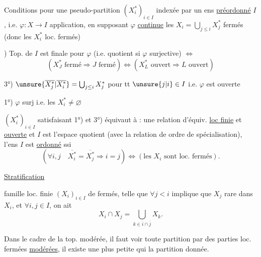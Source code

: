 Conditions pour une pseudo-partition $(X_i^*)_{i\in I}$  indexée par un ens
\uline{préordonné} $I$, i.e. $\varphi:X\longrightarrow I$ application, en supposant $\varphi$ \uline{continue}
 les $X_i=\bigcup_{j\leq i}X_j^*$ fermés (donc les $X_i^*$ loc. fermés)

) Top. de $I$ est finale pour $\varphi$ (i.e. quotient si $\varphi$ surjective) $\Longleftrightarrow$
\[
(X_J^*\text{ fermé}\Rightarrow J\text{ fermé})\Longleftrightarrow
(X_L^*\text{ ouvert}\Rightarrow L\text{ ouvert})
\]

3°) $\unsure{\overline{X_j^*}|\overline{X_i^*}}=\bigcup_{j\leq i}X_j^*$ pour tt $\unsure{j|i}\in I$ i.e. $\varphi$ est ouverte

1°) $\varphi$ surj i.e. les $X_i^*\ne\varnothing$


 $(X_i^*)_{i\in I}$ satisfaisant 1°) et 3°) équivaut à
 : une relation d'équiv. \uline{loc finie} et \uline{ouverte}
et $I$ est l'espace quotient (avec la relation de ordre
de spécialisation),  l'ens $I$ est \uline{ordonné} ssi
\[
(\forall i,j\quad\overline{X_i^*}=\overline{X_j^*}\Rightarrow i=j)
\Longleftrightarrow(\text{les }X_i\text{ sont loc. fermés}).
\]

\uline{Stratification} \uline{}

famille loc. finie  $(X_i)_{i\in I}$ de fermés, telle que $\forall j<i$
implique que $X_j$ rare dans $X_i$, et $\forall i,j\in I$,
on ait
\[
X_i\cap X_j=\bigcup_{k\in\overline i\cap\overline j}X_k.
\]

Dans le cadre de la top. modérée, il faut voir 
 toute partition par des parties loc. fermées \uline{modérées},
il existe une plus petite 
  qui
 la partition donnée.


